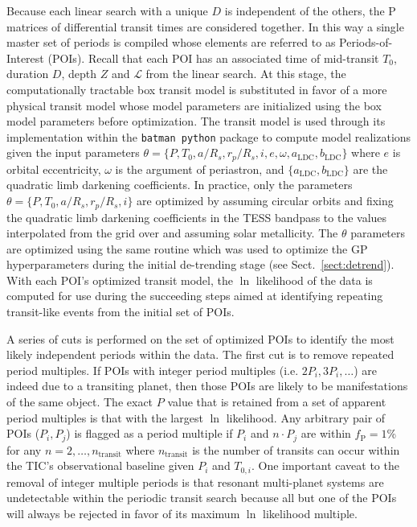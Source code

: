 Because each linear search with a unique $D$ is independent of the others, the P matrices of
differential transit times are considered together. In this way a single master set of periods
is compiled whose elements are referred to as Periods-of-Interest (POIs). Recall that each POI has
an associated time of mid-transit $T_0$, duration $D$, depth $Z$ and $\mathcal{L}$
from the linear search. At this stage,
the computationally tractable box transit model is substituted in favor of a more
physical transit model whose model parameters are initialized using the box model parameters before
optimization. The \cite{mandel02} transit model is used through its implementation within the
\texttt{batman python} package \citep{kreidberg15} to
compute model realizations given the input parameters
$\theta=\{P, T_0,a/R_s, r_p/R_s,i,e,\omega,a_{\text{LDC}},b_{\text{LDC}}\}$ where $e$ is orbital eccentricity,
$\omega$ is the argument of periastron, and $\{a_{\text{LDC}},b_{\text{LDC}}\}$ are the quadratic limb
darkening coefficients. In practice, only
the parameters $\theta=\{P,T_0,a/R_s,r_p/R_s,i\}$ are optimized by assuming circular orbits and fixing
the quadratic limb darkening coefficients in the TESS bandpass to the values interpolated
from the \cite{claret17} grid over \teff{,} \logg{,} and assuming solar metallicity. The $\theta$
parameters are optimized using the same routine which was used to optimize the GP hyperparameters during
the initial de-trending stage (see Sect.~\ref{sect:detrend}). With each POI's optimized transit
model, the $\ln$ likelihood of the data is computed for use during the succeeding steps
aimed at identifying repeating transit-like events from the initial set of POIs.

A series of cuts is performed on the set of optimized POIs to identify the most likely independent
periods within the data. The first cut is to remove repeated period multiples.
If POIs with integer period multiples (i.e. $2P_i,3P_i,\dots$) are indeed due to a transiting planet,
then those POIs are likely to be manifestations of the same object. The exact $P$ value that is retained
from a set of apparent period multiples is that
with the largest $\ln$ likelihood. Any arbitrary pair of POIs ($P_i,P_j$) is flagged
as a period multiple if $P_i$ and $n\cdot P_j$ are within $f_{\text{P}}=1$\% for any
$n=2,\dots,n_{\text{transit}}$ where $n_{\text{transit}}$ is the number of transits can occur within the
TIC's observational baseline given $P_i$ and $T_{0,i}$.
One important caveat to the removal of integer multiple periods is that resonant multi-planet systems
are undetectable within the periodic transit search because all but one of the POIs will always be
rejected in favor of its maximum $\ln$ likelihood multiple.

